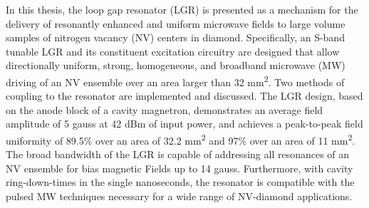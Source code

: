 % 
% 
%


In this thesis, the loop gap resonator (LGR) is presented as a mechanism for the delivery of resonantly enhanced and uniform microwave fields to large volume samples of nitrogen vacancy (NV) centers in diamond. Specifically, an S-band tunable LGR and its constituent excitation circuitry are designed that allow directionally uniform, strong, homogeneous, and broadband
microwave (MW) driving of an NV ensemble over an area larger than 32 mm\textsuperscript{2}. Two methods of coupling to the resonator are implemented and discussed. The LGR design, based on the anode
block of a cavity magnetron, demonstrates an average field amplitude of 5 gauss at 42 dBm of input power, and achieves a peak-to-peak
field uniformity of 89.5\% over an area of 32.2 mm\textsuperscript{2} and 97\% over an area of 11 mm\textsuperscript{2}. The broad bandwidth of the LGR is capable of addressing all resonances of an NV ensemble for bias magnetic Fields up to 14 gauss. Furthermore, with cavity
ring-down-times in the single nanoseconds, the resonator is compatible with the pulsed MW techniques necessary for a wide range of NV-diamond
applications.

